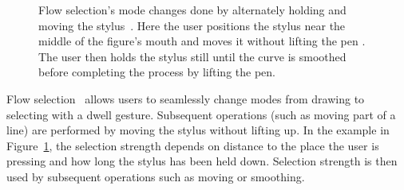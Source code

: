 \begin{figure}
  \centering

  \caption{Flow selection's mode changes done by alternately holding
  and moving the stylus~\cite{johnson-flow-selection}. Here the user
  positions the stylus near the middle of the figure's mouth
  and  moves it without lifting the
  pen . The user then holds the stylus
  still until the curve is smoothed 
  before completing the process by lifting the
  pen.}  \label{fig:flow-selection}
\end{figure}


Flow selection~\cite{johnson-flow-selection} allows users to
seamlessly change modes from drawing to selecting with a dwell
gesture. Subsequent operations (such as moving part of a line) are
performed by moving the stylus without lifting up. In the example in
Figure~\ref{fig:flow-selection}, the selection strength depends on
distance to the place the user is pressing and how long the stylus has
been held down. Selection strength is then used by subsequent
operations such as moving or smoothing.

